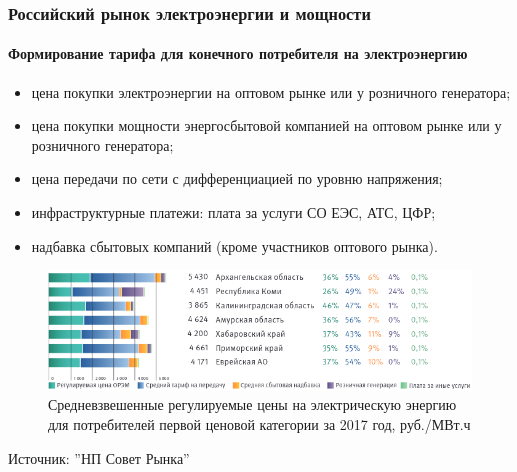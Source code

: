 \documentclass[c, dvipsnames]{beamer}  %
\begin{document}
\begin{frame}[shrink=5]
\frametitle{Российский рынок электроэнергии и мощности} 
\framesubtitle{Формирование тарифа для конечного потребителя на электроэнергию} 


\footnotesize{
\begin{itemize}
	\item цена покупки электроэнергии на оптовом рынке или у розничного генератора;
	\item  цена покупки мощности энергосбытовой компанией на оптовом рынке или у розничного генератора;
	\item  цена передачи по сети с дифференциацией по уровню напряжения;
	\item  инфраструктурные платежи: плата за услуги СО ЕЭС, АТС, ЦФР; 
	\item  надбавка сбытовых компаний  (кроме участников оптового рынка).
	
\end{itemize}
} 


\begin{figure}
	\centering
	\includegraphics[width=0.7\linewidth]{screenshot024}
	\caption{Средневзвешенные регулируемые цены на электрическую энергию для потребителей первой ценовой категории за 2017 год, руб./МВт.ч }
	\label{fig:screenshot024}
\end{figure}

Источник: ''НП Совет Рынка''

\end{frame}
\end{document}
